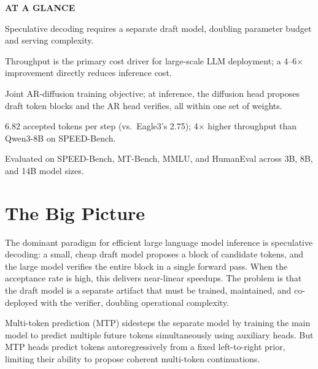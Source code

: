 \documentclass[10pt,twocolumn]{article}
\begin{document}
\begin{mdframed}[backgroundcolor=boxgray,linecolor=rulered,linewidth=1pt,
    innerleftmargin=6pt,innerrightmargin=6pt,
    innertopmargin=6pt,innerbottommargin=6pt]
\textbf{\small AT A GLANCE}\par\vspace{4pt}
\begin{description}[leftmargin=0pt,labelsep=4pt,itemsep=2pt,parsep=0pt,
    font=\small\bfseries]
  \item[Problem:] Speculative decoding requires a separate draft model,
    doubling parameter budget and serving complexity.
  \item[Why it matters:] Throughput is the primary cost driver for
    large-scale LLM deployment; a 4--6$\times$ improvement directly
    reduces inference cost.
  \item[Method:] Joint AR-diffusion training objective; at inference,
    the diffusion head proposes draft token blocks and the AR head
    verifies, all within one set of weights.
  \item[Result:] 6.82 accepted tokens per step (vs.\ Eagle3's 2.75);
    4$\times$ higher throughput than Qwen3-8B on SPEED-Bench.
  \item[Evidence:] Evaluated on SPEED-Bench, MT-Bench, MMLU, and
    HumanEval across 3B, 8B, and 14B model sizes.
\end{description}
\end{mdframed}

\section{The Big Picture}

The dominant paradigm for efficient large language model inference is
speculative decoding: a small, cheap draft model proposes a block of
candidate tokens, and the large model verifies the entire block in a
single forward pass. When the acceptance rate is high, this delivers
near-linear speedups. The problem is that the draft model is a
separate artifact that must be trained, maintained, and co-deployed
with the verifier, doubling operational complexity.

Multi-token prediction (MTP) sidesteps the separate model by training
the main model to predict multiple future tokens simultaneously using
auxiliary heads. But MTP heads predict tokens autoregressively from
a fixed left-to-right prior, limiting their ability to propose coherent
multi-token continuations.
\end{document}
